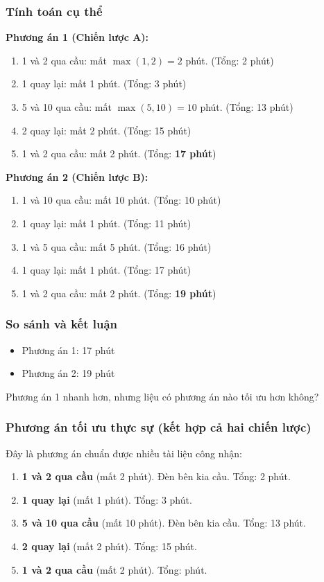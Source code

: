 \documentclass[12pt,a4paper]{article}
\begin{document}
\subsubsection*{Tính toán cụ thể}

\textbf{Phương án 1 (Chiến lược A):}
\begin{enumerate}[label=--]
    \item 1 và 2 qua cầu: mất $\max(1,2)=2$ phút. (Tổng: 2 phút)
    \item 1 quay lại: mất 1 phút. (Tổng: 3 phút)
    \item 5 và 10 qua cầu: mất $\max(5,10)=10$ phút. (Tổng: 13 phút)
    \item 2 quay lại: mất 2 phút. (Tổng: 15 phút)
    \item 1 và 2 qua cầu: mất 2 phút. (Tổng: \textbf{17 phút})
\end{enumerate}

\textbf{Phương án 2 (Chiến lược B):}
\begin{enumerate}[label=--]
    \item 1 và 10 qua cầu: mất 10 phút. (Tổng: 10 phút)
    \item 1 quay lại: mất 1 phút. (Tổng: 11 phút)
    \item 1 và 5 qua cầu: mất 5 phút. (Tổng: 16 phút)
    \item 1 quay lại: mất 1 phút. (Tổng: 17 phút)
    \item 1 và 2 qua cầu: mất 2 phút. (Tổng: \textbf{19 phút})
\end{enumerate}

\subsubsection*{So sánh và kết luận}
\begin{itemize}
    \item Phương án 1: 17 phút
    \item Phương án 2: 19 phút
\end{itemize}
Phương án 1 nhanh hơn, nhưng liệu có phương án nào tối ưu hơn không?

\subsubsection*{Phương án tối ưu thực sự (kết hợp cả hai chiến lược)}
Đây là phương án chuẩn được nhiều tài liệu công nhận:

\begin{enumerate}[label=\textbf{Bước \arabic*:}]
    \item \textbf{1 và 2 qua cầu} (mất 2 phút). Đèn bên kia cầu. Tổng: 2 phút.
    \item \textbf{1 quay lại} (mất 1 phút). Tổng: 3 phút.
    \item \textbf{5 và 10 qua cầu} (mất 10 phút). Đèn bên kia cầu. Tổng: 13 phút.
    \item \textbf{2 quay lại} (mất 2 phút). Tổng: 15 phút.
    \item \textbf{1 và 2 qua cầu} (mất 2 phút). Tổng:  phút.
\end{enumerate}
\end{document}
